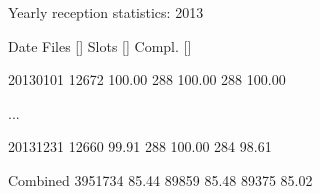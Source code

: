 \documentclass[letterpaper,10pt,english]{sphinxmanual}
\begin{document}
\begin{sphinxVerbatim}[commandchars=\\\{\}]
\PYGZbs{}\PYGZsh{}\PYGZbs{}\PYGZsh{}\PYGZbs{}\PYGZsh{}\PYGZbs{}\PYGZsh{}\PYGZbs{}\PYGZsh{}\PYGZbs{}\PYGZsh{}\PYGZbs{}\PYGZsh{}\PYGZbs{}\PYGZsh{}\PYGZbs{}\PYGZsh{}\PYGZbs{}\PYGZsh{}\PYGZbs{}\PYGZsh{}\PYGZbs{}\PYGZsh{}\PYGZbs{}\PYGZsh{}\PYGZbs{}\PYGZsh{}\PYGZbs{}\PYGZsh{}\PYGZbs{}\PYGZsh{}\PYGZbs{}\PYGZsh{}\PYGZbs{}\PYGZsh{}\PYGZbs{}\PYGZsh{}\PYGZbs{}\PYGZsh{}\PYGZbs{}\PYGZsh{}\PYGZbs{}\PYGZsh{}\PYGZbs{}\PYGZsh{}\PYGZbs{}\PYGZsh{}\PYGZbs{}\PYGZsh{}\PYGZbs{}\PYGZsh{}\PYGZbs{}\PYGZsh{}\PYGZbs{}\PYGZsh{}

\PYGZbs{}\PYGZsh{} Yearly reception statistics: 2013

\PYGZbs{}\PYGZsh{} Date \PYGZbs{}\PYGZsh{}Files \PYGZbs{}[\PYGZpc{}\PYGZbs{}] \PYGZbs{}\PYGZsh{}Slots \PYGZbs{}[\PYGZpc{}\PYGZbs{}] \PYGZbs{}\PYGZsh{}Compl. \PYGZbs{}[\PYGZpc{}\PYGZbs{}]

\PYGZbs{}\PYGZsh{}\PYGZbs{}\PYGZsh{}\PYGZbs{}\PYGZsh{}\PYGZbs{}\PYGZsh{}\PYGZbs{}\PYGZsh{}\PYGZbs{}\PYGZsh{}\PYGZbs{}\PYGZsh{}\PYGZbs{}\PYGZsh{}\PYGZbs{}\PYGZsh{}\PYGZbs{}\PYGZsh{}\PYGZbs{}\PYGZsh{}\PYGZbs{}\PYGZsh{}\PYGZbs{}\PYGZsh{}\PYGZbs{}\PYGZsh{}\PYGZbs{}\PYGZsh{}\PYGZbs{}\PYGZsh{}\PYGZbs{}\PYGZsh{}\PYGZbs{}\PYGZsh{}\PYGZbs{}\PYGZsh{}\PYGZbs{}\PYGZsh{}\PYGZbs{}\PYGZsh{}\PYGZbs{}\PYGZsh{}\PYGZbs{}\PYGZsh{}\PYGZbs{}\PYGZsh{}\PYGZbs{}\PYGZsh{}\PYGZbs{}\PYGZsh{}\PYGZbs{}\PYGZsh{}\PYGZbs{}\PYGZsh{}
2013\PYGZhy{}01\PYGZhy{}01 12672 100.00 288 100.00 288 100.00

\PYGZbs{}...

2013\PYGZhy{}12\PYGZhy{}31 12660 99.91 288 100.00 284 98.61

\PYGZbs{}\PYGZsh{}\PYGZbs{}\PYGZsh{}\PYGZbs{}\PYGZsh{}\PYGZbs{}\PYGZsh{}\PYGZbs{}\PYGZsh{}\PYGZbs{}\PYGZsh{}\PYGZbs{}\PYGZsh{}\PYGZbs{}\PYGZsh{}\PYGZbs{}\PYGZsh{}\PYGZbs{}\PYGZsh{}\PYGZbs{}\PYGZsh{}\PYGZbs{}\PYGZsh{}\PYGZbs{}\PYGZsh{}\PYGZbs{}\PYGZsh{}\PYGZbs{}\PYGZsh{}\PYGZbs{}\PYGZsh{}\PYGZbs{}\PYGZsh{}\PYGZbs{}\PYGZsh{}\PYGZbs{}\PYGZsh{}\PYGZbs{}\PYGZsh{}\PYGZbs{}\PYGZsh{}\PYGZbs{}\PYGZsh{}\PYGZbs{}\PYGZsh{}\PYGZbs{}\PYGZsh{}\PYGZbs{}\PYGZsh{}\PYGZbs{}\PYGZsh{}\PYGZbs{}\PYGZsh{}\PYGZbs{}\PYGZsh{}

Combined 3951734 85.44 89859 85.48 89375 85.02

\PYGZbs{}\PYGZsh{}\PYGZbs{}\PYGZsh{}\PYGZbs{}\PYGZsh{}\PYGZbs{}\PYGZsh{}\PYGZbs{}\PYGZsh{}\PYGZbs{}\PYGZsh{}\PYGZbs{}\PYGZsh{}\PYGZbs{}\PYGZsh{}\PYGZbs{}\PYGZsh{}\PYGZbs{}\PYGZsh{}\PYGZbs{}\PYGZsh{}\PYGZbs{}\PYGZsh{}\PYGZbs{}\PYGZsh{}\PYGZbs{}\PYGZsh{}\PYGZbs{}\PYGZsh{}\PYGZbs{}\PYGZsh{}\PYGZbs{}\PYGZsh{}\PYGZbs{}\PYGZsh{}\PYGZbs{}\PYGZsh{}\PYGZbs{}\PYGZsh{}\PYGZbs{}\PYGZsh{}\PYGZbs{}\PYGZsh{}\PYGZbs{}\PYGZsh{}\PYGZbs{}\PYGZsh{}\PYGZbs{}\PYGZsh{}\PYGZbs{}\PYGZsh{}\PYGZbs{}\PYGZsh{}\PYGZbs{}\PYGZsh{}
\end{sphinxVerbatim}
\end{document}
